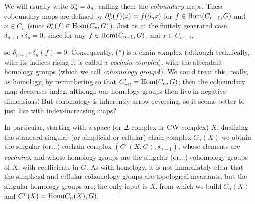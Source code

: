 \ssk

We will usually write $\partial_n^* = \delta_n$, calling them the {\it coboundary} maps.
These coboundary maps are defined by $\partial_n^*(f)(x) = f(\partial_n x)$ for 
$f\in \text{Hom}(C_{n-1},G)$ and $x\in C_n$ (since $\partial_n^*(f)\in \text{Hom}(C_n,G)$).
Just as in the finitely generated case, $\delta_{n+1}\circ\delta_n=0$, since
for any $f\in\text{Hom}(C_{n-1},G)$, and $x\in C_{n+1}$, 

\ssk


\ssk

so $\delta_{n+1}\circ\delta_n(f) = 0$. Consequently, (*) is a chain complex (although 
technically, with its indices rising it is called a {\it cochain complex}), with the
attendant homology groups (which we call {\it cohomology groups}!). We could treat 
this, really, as homology, by renumbering so that $C_{-n}^\prime = \text{Hom}(C_n,G)$;
then the coboundary map decreases index, although our homology groups then live
in negative dimensions! But cohomology is inherently arrow-reversing, so it seems
better to just live with index-increasing maps?

\msk

In particular, starting with a space (or $\Delta$-complex or CW-complex)
$X$, dualizing the standard singular (or simplicial or cellular) chain complex
$C_n(X)$ we obtain the singular (or...) cochain complex $(C^n(X;G),\delta_{n+1})$,
whose elements are {\it cochains}, and whose homology groups are
the singular (or...) cohomology groups of $X$, with coefficients in $G$. As with
homology, it is not immediately clear that the simplicial and cellular cohomology 
groups are topological invariants, but the singular homology groups are; the
only input is $X$, from which we build $C_n(X)$ and $C^n(X)=\text{Hom}(C_n(X),G)$.

\vfill
\eject




